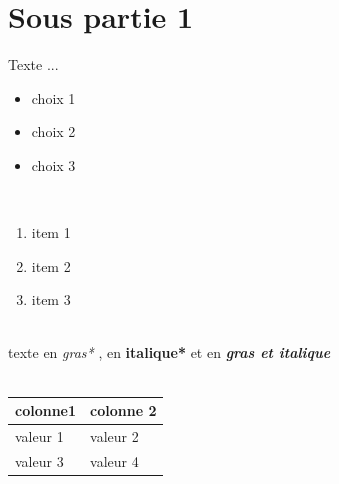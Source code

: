 \documentclass[11pt,fleqn]{book}
\begin{document}
\section{Sous partie 1}
Texte  ...
~\\
\begin{itemize}
\item choix  1
\item choix  2
\item choix  3
\end{itemize}
~\\
\begin{enumerate}
\item item  1
\item item  2
\item item  3 
\end{enumerate}
~\\
texte  en  \textit{gras*} ,  en  \textbf{italique*} et  en  \textbf{\textit{gras et italique}}
~\\
~\\
\begin{tabular}
{|l|l|}
\hline
colonne1 & colonne 2\\
\hline
valeur  1 & valeur  2\\
valeur  3 & valeur  4\\
\hline
\end{tabular}
~\\
~\\
\end{document}
